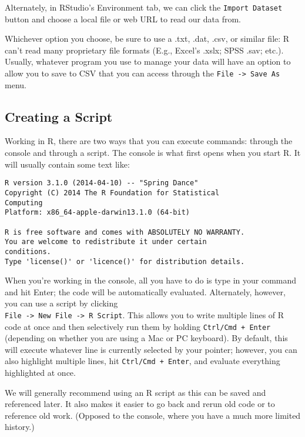 Alternately, in RStudio's Environment tab, we can click the \verb|Import Dataset| button and choose a local file or web URL to read our data from.

Whichever option you choose, be sure to use a .txt, .dat, .csv, or similar file: R can't read many proprietary file formats (E.g., Excel's .xslx; SPSS .sav; etc.). Usually, whatever program you use to manage your data will have an option to allow you to save to CSV that you can access through the \verb|File -> Save As| menu.

\subsection{Creating a Script}
Working in R, there are two ways that you can execute commands: through the console and through a script. The console is what first opens when you start R. It will usually contain some text like:

\begin{framed}
\begin{Verbatim}[samepage=TRUE]
R version 3.1.0 (2014-04-10) -- "Spring Dance"
Copyright (C) 2014 The R Foundation for Statistical
Computing
Platform: x86_64-apple-darwin13.1.0 (64-bit)
 
R is free software and comes with ABSOLUTELY NO WARRANTY.
You are welcome to redistribute it under certain
conditions.
Type 'license()' or 'licence()' for distribution details.
\end{Verbatim}
\end{framed}

When you're working in the console, all you have to do is type in your command and hit Enter; the code will be automatically evaluated. Alternately, however, you can use a script by clicking \\ \verb|File -> New File -> R Script|. This allows you to write multiple lines of R code at once and then selectively run them by holding \verb|Ctrl/Cmd + Enter| (depending on whether you are using a Mac or PC keyboard). By default, this will execute whatever line is currently selected by your pointer; however, you can also highlight multiple lines, hit \verb|Ctrl/Cmd + Enter|, and evaluate everything highlighted at once.

We will generally recommend using an R script as this can be saved and referenced later. It also makes it easier to go back and rerun old code or to reference old work. (Opposed to the console, where you have a much more limited history.)

